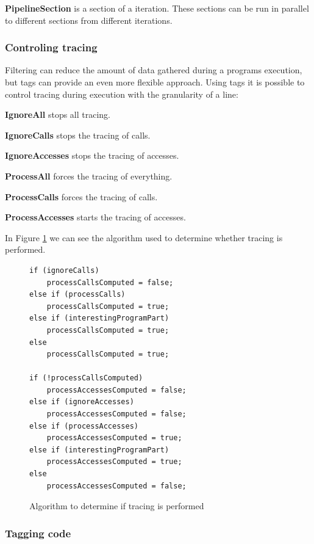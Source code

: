 \textbf{PipelineSection} is a section of a iteration. These sections can be run in parallel to different sections from different iterations.

\subsubsection{Controling tracing}
\label{controllingtracing}

Filtering can reduce the amount of data gathered during a programs execution, but tags can provide an even more flexible approach. Using tags it is possible to control tracing during execution with the granularity of a line:

\textbf{IgnoreAll} stops all tracing.

\textbf{IgnoreCalls} stops the tracing of calls.

\textbf{IgnoreAccesses} stops the tracing of accesses.

\textbf{ProcessAll} forces the tracing of everything.

\textbf{ProcessCalls} forces the tracing of calls.

\textbf{ProcessAccesses} starts the tracing of accesses.

In Figure \ref{cap3:contralg} we can see the algorithm used to determine whether tracing is performed.

\begin{figure}
	\begin{center}
		\begin{verbatim}
if (ignoreCalls)
	processCallsComputed = false;
else if (processCalls)
	processCallsComputed = true;
else if (interestingProgramPart)
	processCallsComputed = true;
else
	processCallsComputed = true;

if (!processCallsComputed)
	processAccessesComputed = false;
else if (ignoreAccesses)
	processAccessesComputed = false;
else if (processAccesses)
	processAccessesComputed = true;
else if (interestingProgramPart)
	processAccessesComputed = true;
else
	processAccessesComputed = false;
		\end{verbatim}
	\end{center}
	\caption{Algorithm to determine if tracing is performed}
	\label{cap3:contralg}
\end{figure}

\subsubsection{Tagging code}


